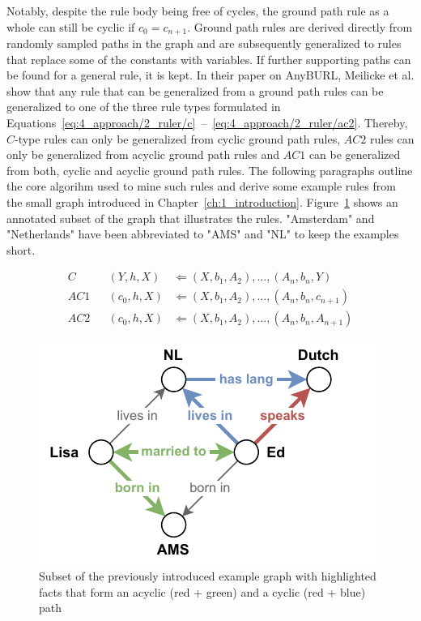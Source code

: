 Notably, despite the rule body being free of cycles, the ground path rule as a whole can still be cyclic if $c_0 = c_{n+1}$. Ground path rules are derived directly from randomly sampled paths in the graph and are subsequently generalized to rules that replace some of the constants with variables. If further supporting paths can be found for a general rule, it is kept. In their paper on AnyBURL, Meilicke et al. show that any rule that can be generalized from a ground path rules can be generalized to one of the three rule types formulated in Equations~\ref{eq:4_approach/2_ruler/c}~--~\ref{eq:4_approach/2_ruler/ac2}. Thereby, $C$-type rules can only be generalized from cyclic ground path rules, $AC2$ rules can only be generalized from acyclic ground path rules and $AC1$ can be generalized from both, cyclic and acyclic ground path rules. The following paragraphs outline the core algorihm used to mine such rules and derive some example rules from the small graph introduced in Chapter~\ref{ch:1_introduction}. Figure~\ref{fig:4_approach/2_ruler/rule_graph} shows an annotated subset of the graph that illustrates the rules. "Amsterdam" and "Netherlands" have been abbreviated to "AMS" and "NL" to keep the examples short.

\begin{align}
    C   && (Y, h, X)   &\Leftarrow (X, b_1, A_2), \dots, (A_n, b_n, Y)
    \label{eq:4_approach/2_ruler/c} \\
    AC1 && (c_0, h, X) &\Leftarrow (X, b_1, A_2), \dots, (A_n, b_n, c_{n+1})
    \label{eq:4_approach/2_ruler/ac1} \\
    AC2 && (c_0, h, X) &\Leftarrow (X, b_1, A_2), \dots, (A_n, b_n, A_{n+1})
    \label{eq:4_approach/2_ruler/ac2}
\end{align}

\begin{figure}[t]
    \centering
    \includegraphics{4_approach/2_ruler/rule_graph}
    \caption{Subset of the previously introduced example graph with highlighted facts that form an acyclic (red + green) and a cyclic (red + blue) path}
    \label{fig:4_approach/2_ruler/rule_graph}
\end{figure}

